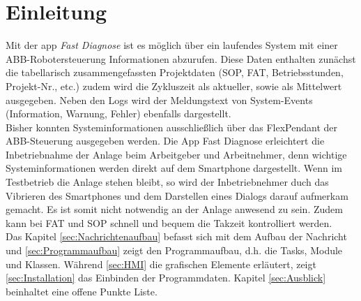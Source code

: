 \chapter{Einleitung}
%
%
Mit der \gls{app} \textit{Fast Diagnose} ist es möglich über ein laufendes 
System mit einer ABB-Robotersteuerung Informationen abzurufen. Diese Daten 
enthalten zunächst die tabellarisch zusammengefassten Projektdaten (SOP, FAT, 
Betriebsstunden, Projekt-Nr., etc.) zudem wird die Zykluszeit als aktueller, 
sowie als Mittelwert ausgegeben. Neben den Logs wird der Meldungstext von 
System-Events (Information, Warnung, Fehler) ebenfalls dargestellt.\\
%
%
Bisher konnten Systeminformationen ausschließlich über das FlexPendant der 
ABB-Steuerung ausgegeben werden. Die App Fast Diagnose erleichtert die 
Inbetriebnahme der Anlage beim Arbeitgeber und Arbeitnehmer, denn wichtige 
Systeminformationen werden direkt auf dem Smartphone dargestellt. Wenn im 
Testbetrieb die Anlage stehen bleibt, so wird der Inbetriebnehmer duch das 
Vibrieren des Smartphones und dem Darstellen eines Dialogs darauf aufmerkam 
gemacht. Es ist somit nicht notwendig an der Anlage anwesend zu sein.
Zudem kann bei FAT und SOP schnell und bequem die Takzeit kontrolliert werden.\\
%
%
Das Kapitel \ref{sec:Nachrichtenaufbau} befasst sich mit dem Aufbau der 
Nachricht und \ref{sec:Programmaufbau} zeigt den Programmaufbau, d.h. die 
Tasks, Module und Klassen. Während \ref{sec:HMI} die grafischen Elemente 
erläutert, zeigt \ref{sec:Installation} das Einbinden der Programmdaten. 
Kapitel \ref{sec:Ausblick} beinhaltet eine offene Punkte Liste.
